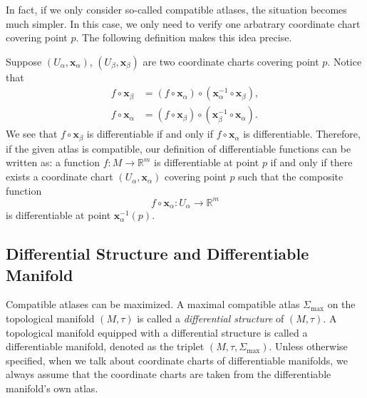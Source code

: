 \documentclass{report}
\begin{document}
In fact, if we only consider so-called compatible atlases, the situation becomes much simpler. In this case, we only need to verify one arbatrary 
coordinate chart covering point $p$. The following definition makes this idea precise.


Suppose $(U_\alpha,\mathbf{x}_\alpha)$, $(U_\beta,\mathbf{x}_\beta)$ are two coordinate charts covering point $p$. Notice that
$$
\begin{aligned}
f\circ \mathbf{x}_\beta &= (f\circ \mathbf{x}_\alpha)\circ(\mathbf{x}^{-1}_\alpha\circ \mathbf{x}_{\beta}),\\
f\circ \mathbf{x}_\alpha &= (f\circ \mathbf{x}_\beta)\circ(\mathbf{x}^{-1}_\beta\circ \mathbf{x}_{\alpha}).
\end{aligned}
$$
We see that $f \circ \mathbf{x}_\beta$ is differentiable if and only if $f \circ \mathbf{x}_\alpha$ is differentiable. Therefore, if the given atlas is compatible, our definition of differentiable functions can be written as: a function $f: M \to \mathbb{R}^m$ is differentiable at point $p$ if and only if there exists a coordinate chart $(U_\alpha, \mathbf{x}_\alpha)$ covering point $p$ such that the composite function
$$
f\circ \mathbf{x}_\alpha:U_\alpha\longrightarrow \mathbb{R}^m
$$
is differentiable at point $\mathbf{x}^{-1}_\alpha(p)$.

\subsection{Differential Structure and Differentiable Manifold}
Compatible atlases can be maximized.
A maximal compatible atlas $\Sigma_{\max}$ on the topological manifold $(M, \tau)$ is called a \emph{differential structure} of $(M, \tau)$. A topological manifold equipped with a differential structure is called a differentiable manifold, denoted as the triplet $(M, \tau, \Sigma_{\max})$. Unless otherwise specified, when we talk about coordinate charts of differentiable manifolds, we always assume that the coordinate charts are taken from the differentiable manifold's own atlas.
\end{document}
